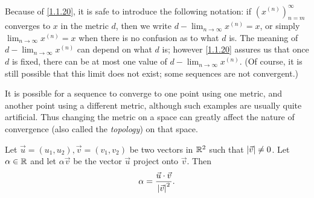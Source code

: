 \begin{note}
  Because of \cref{1.1.20}, it is safe to introduce the following notation:
  if \((x^{(n)})_{n = m}^\infty\) converges to \(x\) in the metric \(d\), then we write \(d - \lim_{n \to \infty} x^{(n)} = x\), or simply \(\lim_{n \to \infty} x^{(n)} = x\) when there is no confusion as to what \(d\) is.
  The meaning of \(d - \lim_{n \to \infty} x^{(n)}\) can depend on what \(d\) is;
  however \cref{1.1.20} assures us that once \(d\) is fixed, there can be at most one value of \(d - \lim_{n \to \infty} x^{(n)}\).
  (Of course, it is still possible that this limit does not exist;
  some sequences are not convergent.)
\end{note}

\begin{rmk}\label{1.1.21}
  It is possible for a sequence to converge to one point using one metric, and another point using a different metric, although such examples are usually quite artificial.
  Thus changing the metric on a space can greatly affect the nature of convergence (also called the \emph{topology}) on that space.
\end{rmk}

\begin{ac}\label{ac:1.1.1}
  Let \(\vec{u} = (u_1, u_2), \vec{v} = (v_1, v_2)\) be two vectors in \(\mathbb{R}^2\) such that \(\left\lvert\vec{v}\right\rvert \neq 0\).
  Let \(\alpha \in \mathbb{R}\) and let \(\alpha \vec{v}\) be the vector \(\vec{u}\) project onto \(\vec{v}\).
  Then
  \[
    \alpha = \dfrac{\vec{u} \cdot \vec{v}}{\left\lvert\vec{v}\right\rvert^2}.
  \]
\end{ac}

